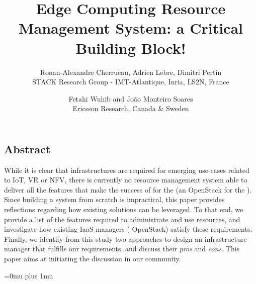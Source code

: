 \documentclass[letterpaper,twocolumn,10pt]{article}
\begin{document}
\date{}

\title{\Large Edge Computing Resource Management System: a Critical Building Block!}

\author{
{\rm Ronan-Alexandre Cherrueau, Adrien Lebre, Dimitri Pertin}\\
STACK Research Group - IMT-Atlantique, Inria, LS2N, France
\and
{\rm Fetahi Wuhib and  João Monteiro Soares}\\
Ericsson Research, Canada \& Sweden\\
} %

\maketitle

\thispagestyle{empty}


\subsection*{Abstract}
While it is clear that \edge infrastructures are required for emerging
use-cases related to IoT, VR or NFV, there is currently no resource management
system able to deliver all the features that make the success of
\cloudcomputing for the \edge (\eg an OpenStack for the \edge).
%
Since building a system from scratch is impractical,
this paper provides reflections regarding
how existing solutions can be leveraged.
%
To that end, we provide a list of the features required to administrate and use
\edgecomputing resources, and investigate how existing IaaS managers (\ie
OpenStack) satisfy these requirements. Finally, we identify from this study two
approaches to design an \edge infrastructure manager that fulfills our
requirements, and discuss their \emph{pros} and \emph{cons}. This paper aims at
initiating the discussion in our community. 






% 
% 


\Urlmuskip=0mu plus 1mu\relax

{\footnotesize
}

\theendnotes
\end{document}
